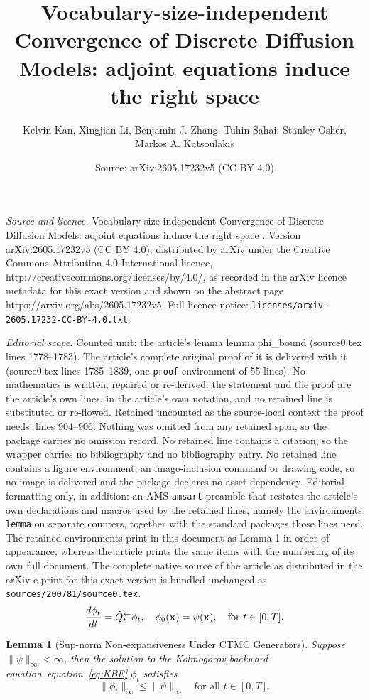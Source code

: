 \documentclass[10pt,a4paper]{amsart}
\title{Vocabulary-size-independent Convergence of Discrete Diffusion Models: adjoint equations induce the right space \vspace{1em}}
\author{Kelvin Kan, Xingjian Li, Benjamin J. Zhang, Tuhin Sahai, Stanley Osher, Markos A. Katsoulakis}
\date{Source: arXiv:2605.17232v5 (CC BY 4.0)}
\newcommand{\KBEeq}{\frac{d\phi_t}{dt}=\tilde{Q}_{t}^{\leftarrow} \phi_t, \quad \phi_0(\bfx)=\psi(\bfx), \quad \text{for } t \in [0, T].}
\newtheorem{lemma}{Lemma}
\newcommand{\bfx}{{\bf x}}
\def\eqref#1{equation~\ref{#1}}
\begin{document}
\maketitle

\noindent\emph{Source and licence.} Vocabulary-size-independent Convergence of Discrete Diffusion Models: adjoint equations induce the right space \vspace{1em}. Version arXiv:2605.17232v5 (CC BY 4.0), distributed by arXiv under the Creative Commons Attribution 4.0 International licence, http://creativecommons.org/licenses/by/4.0/, as recorded in the arXiv licence metadata for this exact version and shown on the abstract page https://arxiv.org/abs/2605.17232v5. Full licence notice: \texttt{licenses/arxiv-2605.17232-CC-BY-4.0.txt}.\par\smallskip

\noindent\textit{Editorial scope.} Counted unit: the article's lemma lemma:phi\_bound (source0.tex lines 1778--1783). The article's complete original proof of it is delivered with it (source0.tex lines 1785--1839, one \texttt{proof} environment of 55 lines). No mathematics is written, repaired or re-derived: the statement and the proof are the article's own lines, in the article's own notation, and no retained line is substituted or re-flowed.  Retained uncounted as the source-local context the proof needs: lines 904--906.  Nothing was omitted from any retained span, so the package carries no omission record.  No retained line contains a citation, so the wrapper carries no bibliography and no bibliography entry.  No retained line contains a figure environment, an image-inclusion command or drawing code, so no image is delivered and the package declares no asset dependency.  Editorial formatting only, in addition: an AMS \texttt{amsart} preamble that restates the article's own declarations and macros used by the retained lines, namely the environments \texttt{lemma} on separate counters, together with the standard packages those lines need.  The retained environments print in this document as Lemma 1 in order of appearance, whereas the article prints the same items with the numbering of its own full document.  The complete native source of the article as distributed in the arXiv e-print for this exact version is bundled unchanged as \texttt{sources/200781/source0.tex}.
\begin{equation}\label{eq:KBE}
    \KBEeq
\end{equation}

\begin{lemma}[Sup-norm Non-expansiveness Under CTMC Generators]\label{lemma:phi_bound}
    Suppose $\| \psi \|_\infty < \infty$, then the solution to the Kolmogorov backward equation~\eqref{eq:KBE} $\phi_t$ satisfies
    \begin{equation}
        \| \phi_t \|_\infty \leq \| \psi \|_\infty \quad \text{for all } t\in [0, T].
    \end{equation}
\end{lemma}
\end{document}
